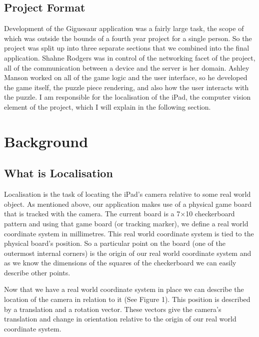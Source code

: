 \documentclass{article}
\begin{document}
\subsection{Project Format}

Development of the Giguesaur application was a fairly large task, the scope of which was outside the bounds of a fourth year project for a single person. So the project was split up into three separate sections that we combined into the final application. Shahne Rodgers was in control of the networking facet of the project, all of the communication between a device and the server is her domain. Ashley Manson worked on all of the game logic and the user interface, so he developed the game itself, the puzzle piece rendering, and also how the user interacts with the puzzle. I am responsible for the localisation of the iPad, the computer vision element of the project, which I will explain in the following section. 


\section{Background}
\subsection{What is Localisation}

Localisation is the task of locating the iPad's camera relative to some real world object. As mentioned above, our application makes use of a physical game board that is tracked with the camera. The current board is a 7$\times$10 checkerboard pattern and using that game board (or tracking marker), we define a real world coordinate system in millimetres. This real world coordinate system is tied to the physical board's position. So a particular point on the board (one of the outermost internal corners) is the origin of our real world coordinate system and as we know the dimensions of the squares of the checkerboard we can easily describe other points. \par

Now that we have a real world coordinate system in place we can describe the location of the camera in relation to it (See Figure 1). This position is described by a translation and a rotation vector. These vectors give the camera's translation and change in orientation relative to the origin of our real world coordinate system.\par 

\end{document}
